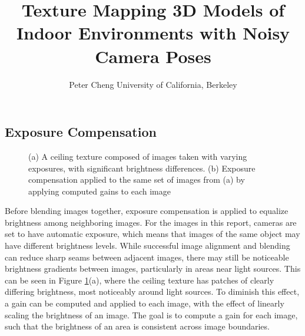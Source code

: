 \message{ !name(masters.tex)}\documentclass[]{spie}  %
\title{Texture Mapping 3D Models of Indoor Environments with Noisy Camera Poses}
\author{Peter Cheng
\skiplinehalf
University of California, Berkeley\\
}
\begin{document}
\subsection{Exposure Compensation}
\label{sec:exposureCompensation}

\begin{figure}
  \centering
  \caption{(a) A ceiling texture composed of images taken with varying
    exposures, with significant brightness differences. (b) Exposure
    compensation applied to the same set of images from (a) by
    applying computed gains to each image}
  \label{fig:exposureDiff}
\end{figure}


Before blending images together, exposure compensation is applied to
equalize brightness among neighboring images. For the images in this
report, cameras are set to have automatic exposure, which means that
images of the same object may have different brightness levels. While
successful image alignment and blending can reduce sharp seams between
adjacent images, there may still be noticeable brightness gradients
between images, particularly in areas near light sources. This can be
seen in Figure \ref{fig:exposureDiff}(a), where the ceiling texture
has patches of clearly differing brightness, most noticeably around
light sources. To diminish this effect, a gain can be computed and
applied to each image, with the effect of linearly scaling the
brightness of an image. The goal is to compute a gain for each image,
such that the brightness of an area is consistent across image
boundaries.
\end{document}
